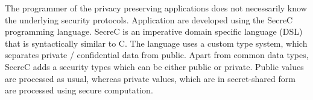 The programmer of the privacy preserving applications does not necessarily know the underlying security protocols.
Application are developed using the SecreC programming language.
SecreC is an imperative domain specific language (DSL) that is syntactically similar to C.
The language uses a custom type system, which separates private / confidential data from public.
Apart from common data types, SecreC adds a security types which can be either public or private.
Public values are processed as usual, whereas private values, which are in secret-shared form are processed using secure computation.

